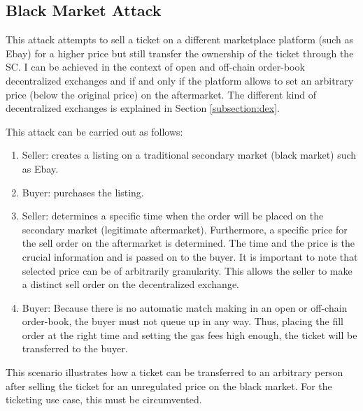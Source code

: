 
\subsection{Black Market Attack}\label{subsection:black-market-attack}
This attack attempts to sell a ticket on a different marketplace platform (such as Ebay) for a higher price but still transfer the ownership of the ticket through the SC. I can be achieved in the context of open and off-chain order-book decentralized exchanges and if and only if the platform allows to set an arbitrary price (below the original price) on the aftermarket. The different kind of decentralized exchanges is explained in Section \ref{subsection:dex}.

This attack can be carried out as follows:

\begin{enumerate}
    \item Seller: creates a listing on a traditional secondary market (black market) such as Ebay.
    \item Buyer: purchases the listing.
    \item Seller: determines a specific time when the order will be placed on the secondary market (legitimate aftermarket). Furthermore, a specific price for the sell order on the aftermarket is determined. The time and the price is the crucial information and is passed on to the buyer. It is important to note that selected price can be of arbitrarily granularity. This allows the seller to make a distinct sell order on the decentralized exchange. 
    \item Buyer: Because there is no automatic match making in an open or off-chain order-book, the buyer must not queue up in any way. Thus, placing the fill order at the right time and setting the gas fees high enough, the ticket will be transferred to the buyer. 
\end{enumerate}

This scenario illustrates how a ticket can be transferred to an arbitrary person after selling the ticket for an unregulated price on the black market. For the ticketing use case, this must be circumvented.
